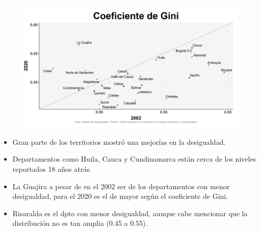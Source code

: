     \begin{figure}[H]
        \caption[Coeficiente de Gini por departamentos - 2002 VS 2020 ]{\label{gini_dptos_vs} }
        \begin{center}
        \includegraphics[width=\textwidth,keepaspectratio]{img/var_254_scatter_time.png}
        \end{center}
    \end{figure}
            \begin{itemize}
                    \item Gran parte de los territorios mostró una mejorías en la desigualdad.
                    \item Departamentos como Huila, Cauca y Cundinamarca están cerca de los niveles reportados 18 años atrás.
                    \item La Guajira a pesar de en el 2002 ser de los departamentos con menor desigualdad, para el 2020 es el de mayor según el coeficiente de Gini.
                    \item Risaralda es el dpto con menor desigualdad, aunque cabe mencionar que la distribución no es tan amplia (0.45 a 0.55).
                    \end{itemize}

